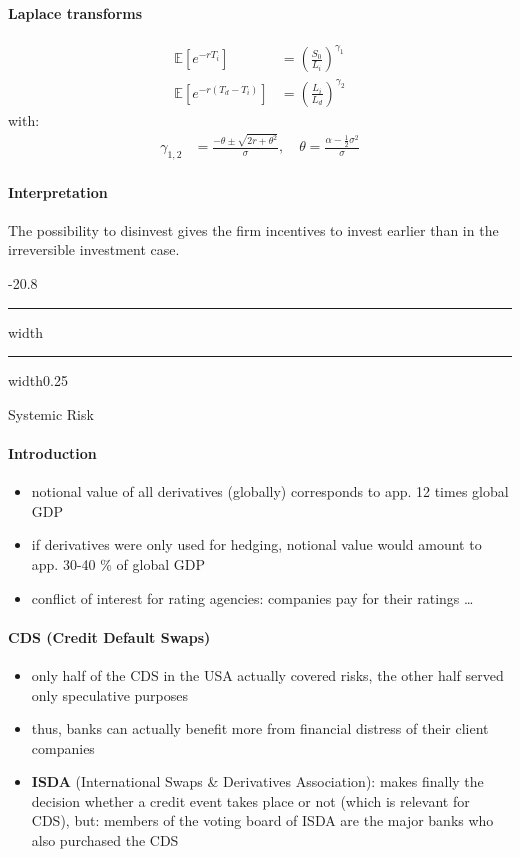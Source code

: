 \documentclass[a4paper,landscape,8pt,fleqn]{scrartcl}
\makeatletter
\renewcommand{\emph}[1]{\textbf{#1}}
\renewcommand{\section}{\@startsection{section}{1}{0mm}%
{-2\baselineskip}{0.8\baselineskip}%
{\hrule depth 0.2pt width\columnwidth\hrule depth1.5pt
width0.25\columnwidth\vspace*{1.2em}\Large\bfseries}}
\makeatother
\begin{document}
\begin{multicols*}{4}
\paragraph{Laplace transforms}
\begin{align*}
\mathbb{E} \left[ e^{-r T_i} \right] &= \left( \frac{S_0}{L_i} \right)^{\gamma_1} \\
\mathbb{E} \left[ e^{-r (T_d - T_i)} \right] &= \left( \frac{L_i}{L_d} \right)^{\gamma_2}
\end{align*}
with:
\begin{align*}
\gamma_{1,2} &= \frac{-\theta \pm \sqrt{2r + \theta^2}}{\sigma}, \quad \theta = \frac{\alpha - \frac{1}{2}\sigma^2}{\sigma}
\end{align*}

\paragraph{Interpretation}
The possibility to disinvest gives the firm incentives to invest earlier than in the irreversible investment case.

\columnbreak

\section{Systemic Risk}

\paragraph{Introduction}
\begin{itemize}
\item notional value of all derivatives (globally) corresponds to app. 12 times global GDP
\item if derivatives were only used for hedging, notional value would amount to app. 30-40 \% of global GDP
\item conflict of interest for rating agencies: companies pay for their ratings \ldots
\end{itemize}

\paragraph{CDS (Credit Default Swaps)}
\begin{itemize}
\item only half of the CDS in the USA actually covered risks, the other half served only speculative purposes
\item thus, banks can actually benefit more from financial distress of their client companies
\item \emph{ISDA} (International Swaps \& Derivatives Association): makes finally the decision whether a credit event takes place or not (which is relevant for CDS), but: members of the voting board of ISDA are the major banks who also purchased the CDS
\end{itemize}


\end{multicols*}
\end{document}
